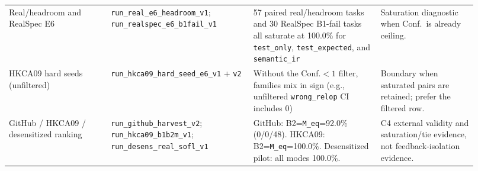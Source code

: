 \begin{table}[t]
\begin{tabular}{@{}p{0.20\linewidth}p{0.28\linewidth}p{0.25\linewidth}p{0.19\linewidth}@{}}
    Real/headroom and RealSpec E6
      & \texttt{run\_real\_e6\_headroom\_v1}; \texttt{run\_realspec\_e6\_b1fail\_v1}
      & 57 paired real/headroom tasks and 30 RealSpec B1-fail tasks all
        saturate at 100.0\% for \texttt{test\_only}, \texttt{test\_expected},
        and \texttt{semantic\_ir}
      & Saturation diagnostic when Conf.\ is already ceiling. \\
    HKCA09 hard seeds (unfiltered)
      & \texttt{run\_hkca09\_hard\_seed\_e6\_v1} + \texttt{v2}
      & Without the Conf.${<}1$ filter, families mix in sign
        (e.g., unfiltered \texttt{wrong\_relop} CI includes 0)
      & Boundary when saturated pairs are retained; prefer the filtered row. \\
    GitHub / HKCA09 / desensitized ranking
      & \texttt{run\_github\_harvest\_v2}; \texttt{run\_hkca09\_b1b2m\_v1};
        \texttt{run\_desens\_real\_sofl\_v1}
      & GitHub: B2=\texttt{M\_eq}=92.0\% (0/0/48).
        HKCA09: B2=\texttt{M\_eq}=100.0\%.
        Desensitized pilot: all modes 100.0\%.
      & C4 external validity and saturation/tie evidence, not feedback-isolation
        evidence. \\
    \bottomrule
  \end{tabular}
\end{table}

